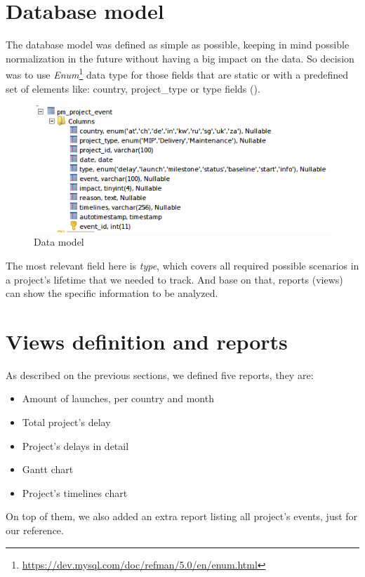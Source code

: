 \section{Database model}
The database model was defined as simple as possible, keeping in mind
possible normalization in the future without having a big impact on the data. So
decision was to use
\emph{Enum}\footnote{\url{https://dev.mysql.com/doc/refman/5.0/en/enum.html}}
data type for those fields that are static or with a predefined set of
elements like: country, project\_type or  type fields
().

\begin{figure}[ht!]
	\centering
   	\includegraphics[width=1\textwidth]{./resources/data_model.png}
   	\caption{Data model}
   	\label{f_data_model}
\end{figure}

The most relevant field here is \emph{type}, which covers all required possible
scenarios in a project's lifetime that we needed to track. And base on that, 
reports (views) can show the specific information to be analyzed.

\section{Views definition and reports}
As described on the previous sections, we defined five reports, they are:

\begin{itemize}
  \item Amount of launches, per country and month
  \item Total project's delay
  \item Project's delays in detail
  \item Gantt chart
  \item Project's timelines chart 
\end{itemize}

On top of them, we also added an extra report listing all project's events,
just for our reference.

